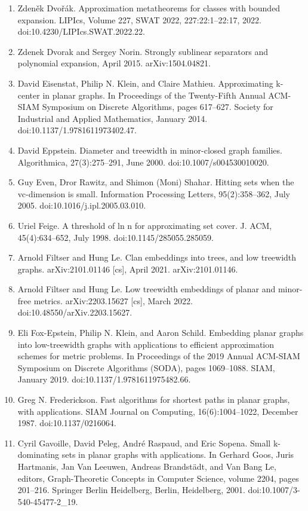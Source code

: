 \documentclass[10pt,a4paper]{article}
\begin{document}
\begin{enumerate}
\item[]  [20]  Zdeněk Dvořák.  Approximation metatheorems for classes with bounded expansion.  LIPIcs, Volume 227, SWAT 2022, 227:22:1–22:17, 2022.  doi:10.4230/LIPIcs.SWAT.2022.22.  
\item[]  [21]  Zdenek Dvorak and Sergey Norin.  Strongly sublinear separators and polynomial expansion, April 2015.  arXiv:1504.04821.  
\item[]  [22]  David Eisenstat, Philip N. Klein, and Claire Mathieu.  Approximating k-center in planar graphs.  In Proceedings of the Twenty-Fifth Annual ACM-SIAM Symposium on Discrete Algorithms, pages 617–627. Society for Industrial and Applied Mathematics, January 2014.  doi:10.1137/1.9781611973402.47.  
\item[]  [23]  David Eppstein.  Diameter and treewidth in minor-closed graph families.  Algorithmica, 27(3):275–291, June 2000.  doi:10.1007/s004530010020.  
\item[]  [24]  Guy Even, Dror Rawitz, and Shimon (Moni) Shahar.  Hitting sets when the vc-dimension is small.  Information Processing Letters, 95(2):358–362, July 2005.  doi:10.1016/j.ipl.2005.03.010.  
\item[]  [25]  Uriel Feige.  A threshold of ln n for approximating set cover.  J. ACM, 45(4):634–652, July 1998.  doi:10.1145/285055.285059.  
\item[]  [26]  Arnold Filtser and Hung Le.  Clan embeddings into trees, and low treewidth graphs.  arXiv:2101.01146 [cs], April 2021.  arXiv:2101.01146.  
\item[]  [27]  Arnold Filtser and Hung Le.  Low treewidth embeddings of planar and minor-free metrics.  arXiv:2203.15627 [cs], March 2022.  doi:10.48550/arXiv.2203.15627.  
\item[]  [28]  Eli Fox-Epstein, Philip N. Klein, and Aaron Schild.  Embedding planar graphs into low-treewidth graphs with applications to efficient approximation schemes for metric problems.  In Proceedings of the 2019 Annual ACM-SIAM Symposium on Discrete Algorithms (SODA), pages 1069–1088. SIAM, January 2019.  doi:10.1137/1.9781611975482.66.  
\item[]  [29]  Greg N. Frederickson.  Fast algorithms for shortest paths in planar graphs, with applications.  SIAM Journal on Computing, 16(6):1004–1022, December 1987.  doi:10.1137/0216064.  
\item[]  [30]  Cyril Gavoille, David Peleg, André Raspaud, and Eric Sopena.  Small k-dominating sets in planar graphs with applications.  In Gerhard Goos, Juris Hartmanis, Jan Van Leeuwen, Andreas Brandstädt, and Van Bang Le, editors, Graph-Theoretic Concepts in Computer Science, volume 2204, pages 201–216. Springer Berlin Heidelberg, Berlin, Heidelberg, 2001.  doi:10.1007/3-540-45477-2\_19.  

\end{enumerate}
\end{document}

